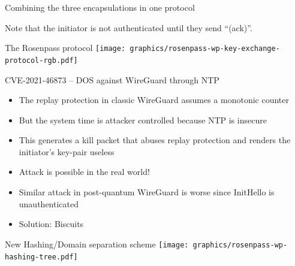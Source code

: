 \begin{frame}{Combining the three encapsulations in one protocol}


  Note that the initiator is not authenticated until they send \enquote{(ack)}.

\end{frame}

\begin{frame}{The Rosenpass protocol}
  \texttt{[image: graphics/rosenpass-wp-key-exchange-protocol-rgb.pdf]}
\end{frame}

\begin{frame}{CVE-2021-46873 – DOS against WireGuard through NTP}
\begin{itemize}
  \item The replay protection in classic WireGuard assumes a monotonic counter
  \item But the system time is attacker controlled because NTP is insecure
  \item This generates a kill packet that abuses replay protection and renders the initiator's key-pair useless
  \item Attack is possible in the real world!
  \item Similar attack in post-quantum WireGuard is worse since InitHello is unauthenticated
  \item Solution: Biscuits
\end{itemize}
\end{frame}

\begin{frame}{New Hashing/Domain separation scheme}
  \texttt{[image: graphics/rosenpass-wp-hashing-tree.pdf]}
\end{frame}

